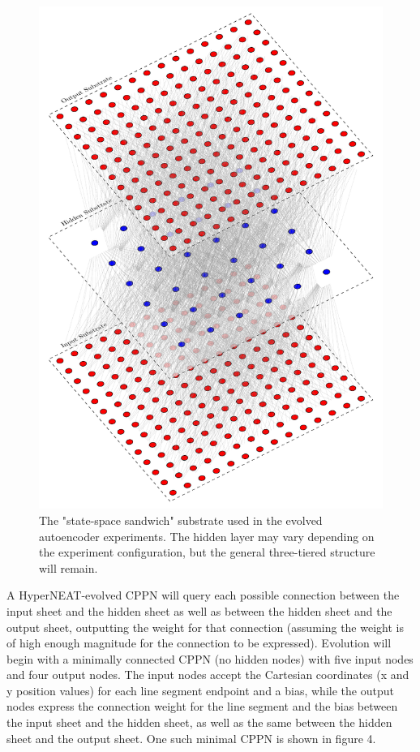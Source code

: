 \documentclass{acm_proc_article-sp}
\begin{document}
\begin{figure}[h]
\caption{The "state-space sandwich" substrate used in the evolved autoencoder experiments.  The hidden layer may vary depending on the experiment configuration, but the general three-tiered structure will remain.}
\centering
\includegraphics[scale=0.55]{SubstrateConfiguration/AutoencoderSubstrate}
\end{figure}

A HyperNEAT-evolved CPPN will query each possible connection between the input sheet and the hidden sheet as well as between the hidden sheet and the output sheet, outputting the weight for that connection (assuming the weight is of high enough magnitude for the connection to be expressed).  Evolution will begin with a minimally connected CPPN (no hidden nodes) with five input nodes and four output nodes.  The input nodes accept the Cartesian coordinates (x and y position values) for each line segment endpoint and a bias, while the output nodes express the connection weight for the line segment and the bias between the input sheet and the hidden sheet, as well as the same between the hidden sheet and the output sheet.  One such minimal CPPN is shown in figure 4.
\end{document}
